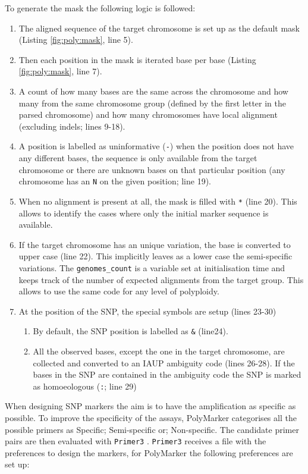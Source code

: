To generate the mask the following logic is followed:
\begin{enumerate}
\item The aligned sequence of the target chromosome is set up as the default mask (Listing \ref{fig:poly:mask}, line 5).
\item Then each position in the mask is iterated base per base (Listing \ref{fig:poly:mask}, line 7).
\item A count of how many bases are the same across the chromosome and how many from the same chromosome group (defined by the first letter in the parsed chromosome) and how many chromosomes have local alignment (excluding \acrshort{indels}; lines 9-18).
\item  A position is labelled as uninformative (\verb|-|) when the position does not have any different bases, the sequence is only available from the target chromosome or there are unknown bases on that particular position (any chromosome has an \verb|N| on the given position; line 19).
\item When no alignment is present at all, the mask is filled with \verb|*| (line 20). This allows to identify the cases where only the initial marker sequence is available.
\item If the target chromosome has an unique variation, the base is converted to upper case (line 22). This implicitly leaves as a lower case the semi-specific variations. The \verb|genomes_count| is a variable set at initialisation time and keeps track of the number of expected alignments from the target group. This allows to use the same code for any level of polyploidy.  
\item At the position of the SNP, the special symbols are setup (lines 23-30)
\begin{enumerate}
\item By default, the SNP position is labelled as \verb|&| (line24).
\item All the observed bases, except the one in the target chromosome, are collected and converted to an IAUP ambiguity code \citep{Cornish-Bowden1985} (lines 26-28). If the bases in the SNP are contained in the ambiguity code the SNP is marked as homoeologous (\verb|:|; line 29)
\end{enumerate}
\end{enumerate}

When designing SNP markers the aim is to have the amplification as specific as possible. 
To improve the specificity of the assays, PolyMarker categorises all the possible primers as Specific; Semi-specific or; Non-specific. 
The candidate primer pairs are then evaluated with \texttt{Primer3} \citep{Rozen}. 
\texttt{Primer3} receives a file with the preferences to design the markers, for PolyMarker the following preferences are set up: 

